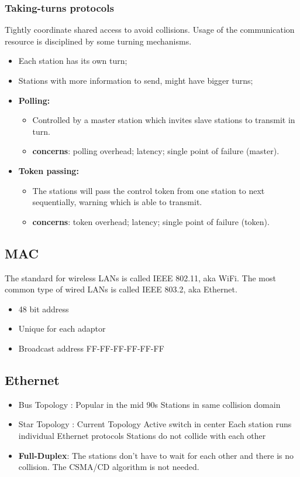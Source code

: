 \documentclass[../resumosRCOM.tex]{subfiles}
\begin{document}
\subsubsection{Taking-turns protocols}
Tightly coordinate shared access to avoid collisions.
\newline
Usage of the communication resource is disciplined by some turning mechanisms.
\begin{itemize}
    \item Each station has its own turn;
    \item Stations with more information to send, might have bigger turns;
    \item \textbf{Polling:}
    \begin{itemize}
        \item Controlled by a master station which invites slave stations to transmit in turn.
        \item \textbf{concerns}: polling overhead; latency; single point of failure (master).
    \end{itemize}
    \item \textbf{Token passing:}
    \begin{itemize}
        \item The stations will pass the control token from one station to next sequentially, warning which is able to transmit.
        \item \textbf{concerns}: token overhead; latency; single point of failure (token).
    \end{itemize}
\end{itemize}
\subsection{MAC}
\newline
The standard for wireless LANs is called IEEE 802.11, aka WiFi.
\newline
The most common type of wired LANs is called IEEE 803.2, aka Ethernet.
\begin{itemize}
    \item 48 bit address
    \item Unique for each adaptor
    \item Broadcast address FF-FF-FF-FF-FF-FF
\end{itemize}
\subsection{Ethernet}
\begin{itemize}
    \item Bus Topology :
    \subitem Popular in the mid 90s
    \subitem Stations in same collision domain
    \item Star Topology :
    \subitem Current Topology
    \subitem Active switch in center
    \subitem Each station runs individual Ethernet protocols
    \subitem Stations do not collide with each other
    \item \textbf{Full-Duplex}: The stations don't have to wait for each other and there is no collision. The CSMA/CD algorithm is not needed.
\end{itemize}
\end{document}
